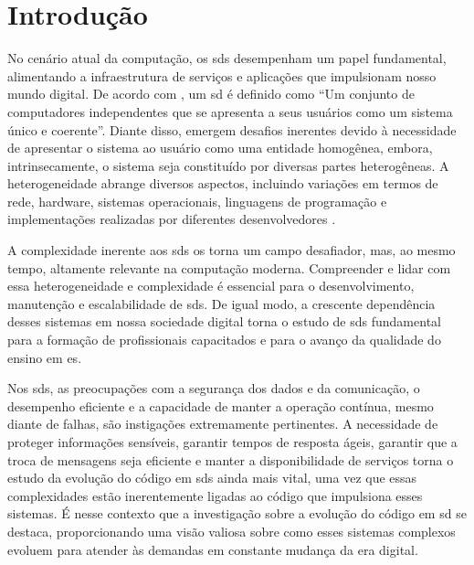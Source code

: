 

\chapter{Introdução}\label{cap:introducao}
No cenário atual da computação, os \gls{sds} desempenham um papel fundamental, alimentando a infraestrutura de serviços e aplicações que impulsionam nosso mundo digital. De acordo com , um \gls{sd} é definido como ``Um conjunto de computadores independentes que se apresenta a seus usuários como um sistema único e coerente''. Diante disso, emergem desafios inerentes devido à necessidade de apresentar o sistema ao usuário como uma entidade homogênea, embora, intrinsecamente, o sistema seja constituído por diversas partes heterogêneas. A heterogeneidade abrange diversos aspectos, incluindo variações em termos de rede, hardware, sistemas operacionais, linguagens de programação e implementações realizadas por diferentes desenvolvedores \cite{DistributedSystemsCoulouris}.

A complexidade inerente aos \gls{sds} os torna um campo desafiador, mas, ao mesmo tempo, altamente relevante na computação moderna. Compreender e lidar com essa heterogeneidade e complexidade é essencial para o desenvolvimento, manutenção e escalabilidade de \gls{sds}. De igual modo, a crescente dependência desses sistemas em nossa sociedade digital torna o estudo de \gls{sds} fundamental para a formação de profissionais capacitados e para o avanço da qualidade do ensino em \gls{es}.

Nos \gls{sds}, as preocupações com a segurança dos dados e da comunicação, o desempenho eficiente e a capacidade de manter a operação contínua, mesmo diante de falhas, são instigações extremamente pertinentes. A necessidade de proteger informações sensíveis, garantir tempos de resposta ágeis, garantir que a troca de mensagens seja eficiente e manter a disponibilidade de serviços torna o estudo da evolução do código em \gls{sds} ainda mais vital, uma vez que essas complexidades estão inerentemente ligadas ao código que impulsiona esses sistemas. É nesse contexto que a investigação sobre a evolução do código em \gls{sd} se destaca, proporcionando uma visão valiosa sobre como esses sistemas complexos evoluem para atender às demandas em constante mudança da era digital.

